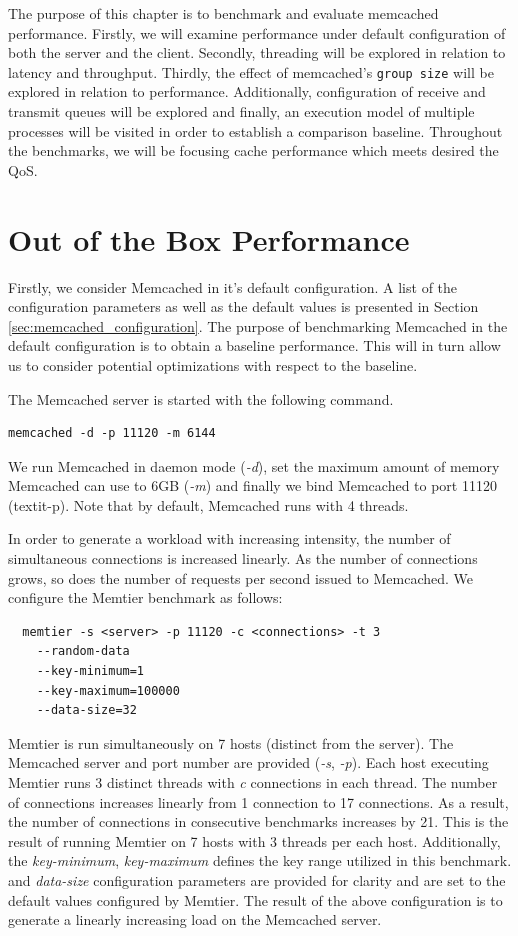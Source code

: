 The purpose of this chapter is to benchmark and evaluate memcached performance. Firstly, we will examine performance under default configuration of both the server and the client. Secondly, threading will be explored in relation to latency and throughput. Thirdly, the effect of memcached's \texttt{group size} will be explored in relation to performance. Additionally, configuration of receive and transmit queues will be explored and finally, an execution model of multiple processes will be visited in order to establish a comparison baseline. Throughout the benchmarks, we will be focusing cache performance which meets desired the QoS.


\section{Out of the Box Performance}

Firstly, we consider Memcached in it's default configuration. A list of the configuration parameters as well as the default values is presented in Section \ref{sec:memcached_configuration}. The purpose of benchmarking Memcached in the default configuration is to obtain a baseline performance. This will in turn allow us to consider potential optimizations with respect to the baseline.

The Memcached server is started with the following command.

\begin{lstlisting}
memcached -d -p 11120 -m 6144
\end{lstlisting}

We run Memcached in daemon mode (\textit{-d}), set the maximum amount of memory Memcached can use to 6GB (\textit{-m}) and finally we bind Memcached to port 11120 (textit{-p}). Note that by default, Memcached runs with 4 threads.


In order to generate a workload with increasing intensity, the number of simultaneous connections is increased linearly. As the number of connections grows, so does the number of requests per second issued to Memcached. We configure the Memtier benchmark as follows:

\begin{lstlisting}
  memtier -s <server> -p 11120 -c <connections> -t 3
    --random-data
    --key-minimum=1
    --key-maximum=100000
    --data-size=32
\end{lstlisting}
Memtier is run simultaneously on 7 hosts (distinct from the server). The Memcached server and port number are provided (\textit{-s}, \textit{-p}). Each host executing Memtier runs 3 distinct threads with \textit{c} connections in each thread. The number of connections increases linearly from 1 connection to 17 connections. As a result, the number of connections in consecutive benchmarks increases by 21. This is the result of running Memtier on 7 hosts with 3 threads per each host. Additionally, the \textit{key-minimum}, \textit{key-maximum} defines the key range utilized in this benchmark. and \textit{data-size} configuration parameters are provided for clarity and are set to the default values configured by Memtier. The result of the above configuration is to generate a linearly increasing load on the Memcached server.


